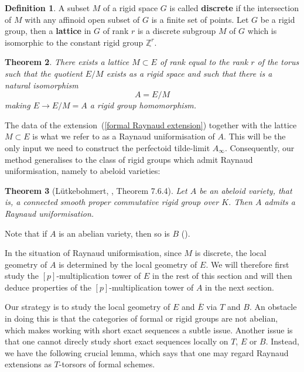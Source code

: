 \documentclass[10pt,oneside]{amsart}
\newtheorem{theorem}{Theorem}[section]
\theoremstyle{definition}
\newtheorem{definition}[theorem]{Definition}
\begin{document}
	\begin{definition}
		A subset $M$ of a rigid space $G$ is called \textbf{discrete} if the intersection of $M$ with any affinoid open subset of $G$ is a finite set of points.
		Let $G$ be a rigid group, then a \textbf{lattice} in $G$ of rank $r$ is a discrete subgroup $M$ of $G$ which is isomorphic to the constant rigid group $\underline{\mathbb Z^r}$. 
	\end{definition}
	
	\begin{theorem}\label{Raynaud uniformisation}
		There exists a lattice $M \subset E$ of rank equal to the rank $r$ of the torus such that the quotient $E/M$ exists as a rigid space and such that there is a natural isomorphism
		\[A=E/M\]
making $E\rightarrow E/M=A$ a rigid group homomorphism. 
	\end{theorem}
	
	The data of the extension~(\ref{formal Raynaud extension}) together with the lattice $M\subset E$ is what we refer to as a Raynaud uniformisation of $A$. This will be the only input we need to construct the perfectoid tilde-limit $A_\infty$. Consequently, our method generalises to the class of rigid groups which admit Raynaud uniformisation, namely to abeloid varieties:
	\begin{theorem}[L\"utkebohmert, \cite{Lut}, Theorem 7.6.4]\label{Raynaud uniformisation for abeloids}
		Let $A$ be an abeloid variety, that is, a connected smooth proper commutative rigid group over $K$. Then $A$ admits a Raynaud uniformisation.
	\end{theorem}
	
Note that if $A$ is an abelian variety, then so is $B$ (\cite[Theorem 6.4.8]{Lut}).

	
	In the situation of Raynaud uniformisation, since $M$ is discrete, the local geometry of $A$ is determined by the local geometry of $E$. We will therefore first study the $[p]$-multiplication tower of $E$ in the rest of this section and will then deduce properties of the $[p]$-multiplication tower of $A$ in the next section.

	 Our strategy is to study the local geometry of $E$ and $\overline{E}$ via $T$ and $B$. An obstacle in doing this is that the categories of formal or rigid groups are not abelian, which makes working with short exact sequences a subtle issue. Another issue is that one cannot direcly study short exact sequences locally on $T$, $E$ or $B$. 
	Instead, we have the following crucial lemma, which says that one may regard Raynaud extensions as $T$-torsors of formal schemes.
\end{document}
